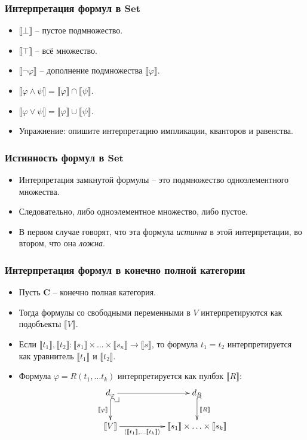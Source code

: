 \documentclass{beamer}
\makeatletter
\theoremstyle{definition}
\newcommand{\cat}[1]{\mathbf{#1}}
\renewcommand{\C}{\cat{C}}
\newcommand{\Set}{\cat{Set}}
\renewcommand{\ll}{\llbracket}
\newcommand{\rr}{\rrbracket}
\newcommand{\pb}[1][dr]{\save*!/#1-1.2pc/#1:(-1,1)@^{|-}\restore}
\makeatother
\begin{document}
\begin{frame}
\frametitle{Интерпретация формул в $\Set$}
\begin{itemize}
\item $\ll \bot \rr$ -- пустое подмножество.
\item $\ll \top \rr$ -- всё множество.
\item $\ll \neg \varphi \rr$ -- дополнение подмножества $\ll \varphi \rr$.
\item $\ll \varphi \land \psi \rr = \ll \varphi \rr \cap \ll \psi \rr$.
\item $\ll \varphi \lor \psi \rr = \ll \varphi \rr \cup \ll \psi \rr$.
\item Упражнение: опишите интерпретацию импликации, кванторов и равенства.
\end{itemize}
\end{frame}

\begin{frame}
\frametitle{Истинность формул в $\Set$}
\begin{itemize}
\item Интерпретация замкнутой формулы -- это подмножество одноэлементного множества.
\item Следовательно, либо одноэлементное множество, либо пустое.
\item В первом случае говорят, что эта формула \emph{истинна} в этой интерпретации, во втором, что она \emph{ложна}.
\end{itemize}
\end{frame}

\begin{frame}
\frametitle{Интерпретация формул в конечно полной категории}
\begin{itemize}
\item Пусть $\C$ -- конечно полная категория.
\item Тогда формулы со свободными переменными в $V$ интерпретируются как подобъекты $\ll V \rr$.
\item Если $\ll t_1 \rr, \ll t_2 \rr : \ll s_1 \rr \times \ldots \times \ll s_n \rr \to \ll s \rr$, то формула $t_1 = t_2$ интерпретируется как уравнитель $\ll t_1 \rr$ и $\ll t_2 \rr$.
\item Формула $\varphi = R(t_1, \ldots t_k)$ интерпретируется как пулбэк $\ll R \rr$:
\[ \xymatrix{ d_\varphi \pb \ar[rr] \ar@{^{(}->}[d]_{\ll \varphi \rr}              & & d_R \ar@{^{(}->}[d]^{\ll R \rr} \\
              \ll V \rr \ar[rr]_-{\langle \ll t_1 \rr, \ldots \ll t_k \rr \rangle} & & \ll s_1 \rr \times \ldots \times \ll s_k \rr
            } \]
\end{itemize}
\end{frame}
\end{document}
